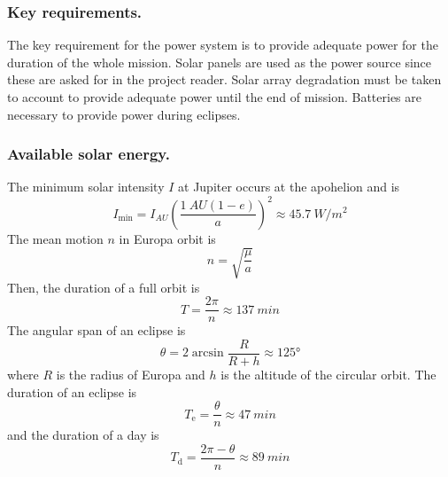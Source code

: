 

\subsubsection{Key requirements.}

The key requirement for the power system is to provide adequate power
for the duration of the whole mission. Solar panels are used as the
power source since these are asked for in the project reader. Solar
array degradation must be taken to account to provide adequate power
until the end of mission. Batteries are necessary to provide power
during eclipses.


\subsubsection{Available solar energy.}

The minimum solar intensity $I$ at Jupiter occurs at the apohelion and is
\begin{equation}
  I_{\mathrm{min}} = I_{\si{AU}} \left(\frac{\SI{1}{AU} (1 - e)}{a}\right)^2
  \approx \SI{45.7}{W/m^2}
\end{equation}
The mean motion $n$ in Europa orbit is
\begin{equation}
  n = \sqrt{\frac{\mu}{a}}
\end{equation}
Then, the duration of a full orbit is
\begin{equation}
  T = \frac{2 \pi}{n} \approx \SI{137}{min}
\end{equation}
The angular span of an eclipse is
\begin{equation}
  \theta = 2 \arcsin \frac{R}{R + h} \approx \ang{125}
\end{equation}
where $R$ is the radius of Europa and $h$ is the altitude of the
circular orbit. The duration of an eclipse is
\begin{equation}
  T_{\mathrm{e}} = \frac{\theta}{n} \approx \SI{47}{min}
\end{equation}
and the duration of a day is
\begin{equation}
  T_{\mathrm{d}} = \frac{2 \pi - \theta}{n} \approx \SI{89}{min}
\end{equation}

